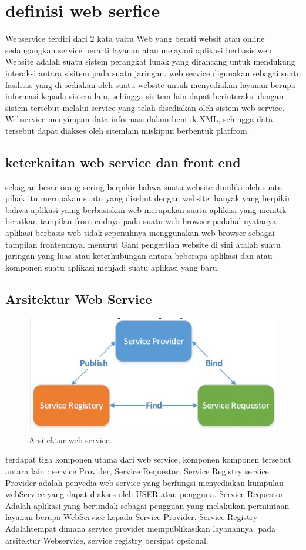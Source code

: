 \section{definisi web serfice }
Webservice terdiri dari 2 kata yaitu Web yang berati websit atau online 
sedangangkan service berarti layanan atau melayani aplikasi berbasis web 
Website adalah suatu sistem perangkat lunak yang dirancang untuk mendukung interaksi antara sisitem pada suatu jaringan.
web service digunakan sebagai suatu fasilitas yang di sediakan oleh suatu website untuk menyediakan layanan berupa informasi kepada 
sistem lain, sehingga sisitem lain dapat berinteraksi dengan sistem tersebut melalui service yang telah disediakan oleh sistem web service.
Webservice menyimpan data informasi dalam bentuk XML, sehingga data tersebut dapat diakses oleh sitemlain miskipun berbentuk platfrom. 
\subsection{keterkaitan web service dan front end }
sebagian besar orang sering berpikir bahwa suatu website dimiliki oleh suatu pihak 
itu merupakan suatu yang disebut dengan website. banyak yang berpikir bahwa aplikasi yamg berbasiskan 
web merupakan suatu aplikasi yang menitik beratkan tampilan front endnya pada suatu web browser 
padahal nyatanya aplikasi berbasis web tidak sepenuhnya menggunakan web browser sebagai tampilan 
frontendnya. menurut Gani pengertian website di sini atalah suatu jaringan yang luas atau keterhubungan 
antara beberapa aplikasi dan atau komponen suatu aplikasi menjadi suatu aplikasi yang baru.
\subsection{Arsitektur Web Service}
\begin{figure}[ht]
\centerline{\includegraphics[width=1\textwidth]{figures/arsitektur.JPG}}
\caption{Arsitektur web service.}
\end{figure}
terdapat tiga komponen utama dari web service, komponen komponen tersebut antara lain :
service Provider, Service Requestor, Service Registry 
service Provider adalah penyedia web service yang berfungsi menyediakan kumpulan webService yang dapat diakses oleh USER atau pengguna.
Service Requestor Adalah aplikasi yang bertindak sebagai pengguan yang melakukan permintaan layanan berupa WebService kepada Service Provider.
Service Registry Adalahtempat dimana service provider mempublikasikan layanannya. pada arsitektur Webservice, service registry bersipat opsional.\cite{kurniawan2015implementasi}


